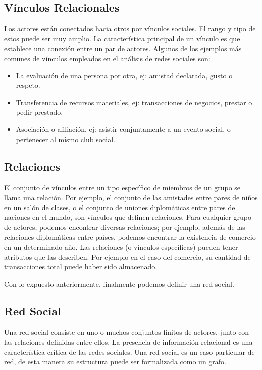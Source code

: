 \subsection{Vínculos Relacionales} %
\label{sub:vinculos_relacionales}
Los actores están conectados hacia otros por vínculos sociales. El rango y tipo de estos puede ser muy amplio. La característica principal de un vínculo es que establece una conexión entre un par de actores. Algunos de los ejemplos más comunes de vínculos empleados en el análisis de redes sociales son:

  \begin{itemize}
    \item La evaluación de una persona por otra, ej: amistad declarada, gusto o respeto.
    \item Transferencia de recursos materiales, ej: transacciones de negocios, prestar o pedir prestado.
    \item Asociación o afiliación, ej: asistir conjuntamente a un evento social, o pertenecer al mismo club social.
  \end{itemize}

\subsection{Relaciones} %
\label{sub:relaciones}
El conjunto de vínculos entre un tipo específico de miembros de un grupo se llama una relación. Por ejemplo, el conjunto de las amistades entre pares de niños en un salón de clases, o el conjunto de uniones diplomáticas entre pares de naciones en el mundo, son vínculos que definen relaciones. Para cualquier grupo de actores, podemos encontrar diversas relaciones; por ejemplo, además de las relaciones diplomáticas entre países, podemos encontrar la existencia de comercio en un determinado año. Las relaciones (o vínculos específicas) pueden tener atributos que las describen. Por ejemplo en el caso del comercio, su cantidad de transacciones total puede haber sido almacenado.

Con lo expuesto anteriormente, finalmente podemos definir una red social.

\subsection{Red Social} %
\label{sub:red_social}
Una red social consiste en uno o muchos conjuntos finitos de actores, junto con las relaciones definidas entre ellos. La presencia de información relacional es una característica crítica de las redes sociales. Una red social es un caso particular de red, de esta manera su estructura puede ser formalizada como un grafo.

